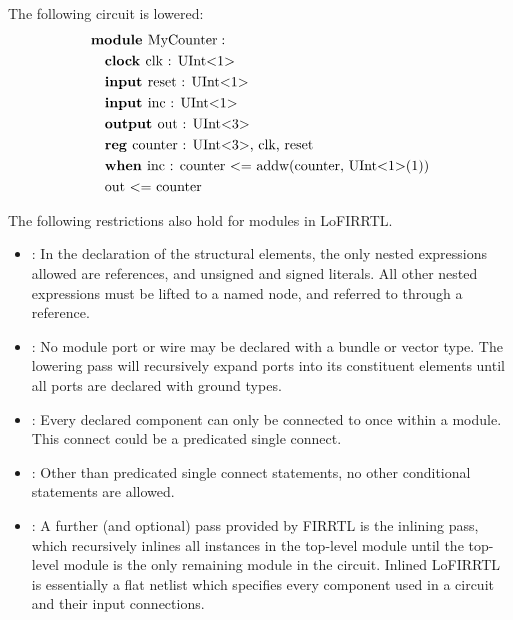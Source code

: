 \documentclass[12pt]{article}
\begin{document}
The following circuit is lowered:
\[
\begin{aligned}
&\text{\bf module\ } \text{MyCounter} :                              \\
&\quad \text{\bf clock\ } \text{clk : UInt$<$1$>$}                        \\
&\quad \text{\bf input\ } \text{reset : UInt$<$1$>$}                        \\
&\quad \text{\bf input\ } \text{inc : UInt$<$1$>$}                           \\
&\quad \text{\bf output\ } \text{out : UInt$<$3$>$}                         \\
&\quad \text{\bf reg\ } \text{counter : UInt$<$3$>$, clk, reset} \\
&\quad \text{\bf when\ } \text{inc : counter $<$= addw(counter, UInt$<$1$>$(1))}   \\
&\quad \text{out $<$= counter}  \\
\end{aligned}
\]

The following restrictions also hold for modules in LoFIRRTL.

\begin{itemize}
\item {} : 
In the declaration of the structural elements, the only nested expressions allowed are references, and unsigned and signed literals.
All other nested expressions must be lifted to a named node, and referred to through a reference. 
\item {} :
No module port or wire may be declared with a bundle or vector type.
The lowering pass will recursively expand ports into its constituent elements until all ports are declared with ground types.
\item {} :
Every declared component can only be connected to once within a module.
This connect could be a predicated single connect.
\item {} :
Other than predicated single connect statements, no other conditional statements are allowed.
\item {} :
A further (and optional) pass provided by FIRRTL is the inlining pass, which recursively inlines all instances in the top-level module until the top-level module is the only remaining module in the circuit.
Inlined LoFIRRTL is essentially a flat netlist which specifies every component used in a circuit and their input connections. 
\end{itemize}
\end{document}
